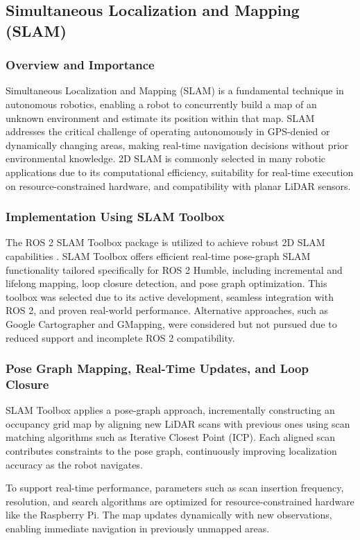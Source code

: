 \documentclass[english,project]{buwthesis}
\begin{document}
\subsection{Simultaneous Localization and Mapping (SLAM)}
\subsubsection{Overview and Importance}
Simultaneous Localization and Mapping (SLAM) is a fundamental technique in autonomous robotics, enabling a robot to concurrently build a map of an unknown environment and estimate its position within that map. SLAM addresses the critical challenge of operating autonomously in GPS-denied or dynamically changing areas, making real-time navigation decisions without prior environmental knowledge. 2D SLAM is commonly selected in many robotic applications due to its computational efficiency, suitability for real-time execution on resource-constrained hardware, and compatibility with planar LiDAR sensors.


\subsubsection{Implementation Using SLAM Toolbox}
The ROS 2 SLAM Toolbox package is utilized to achieve robust 2D SLAM capabilities \cite{Macenski2021}. SLAM Toolbox offers efficient real-time pose-graph SLAM functionality tailored specifically for ROS 2 Humble, including incremental and lifelong mapping, loop closure detection, and pose graph optimization. This toolbox was selected due to its active development, seamless integration with ROS 2, and proven real-world performance. Alternative approaches, such as Google Cartographer and GMapping, were considered but not pursued due to reduced support and incomplete ROS 2 compatibility.

\subsubsection{Pose Graph Mapping, Real-Time Updates, and Loop Closure}

SLAM Toolbox applies a pose-graph approach, incrementally constructing an occupancy grid map by aligning new LiDAR scans with previous ones using scan matching algorithms such as Iterative Closest Point (ICP). Each aligned scan contributes constraints to the pose graph, continuously improving localization accuracy as the robot navigates.

To support real-time performance, parameters such as scan insertion frequency, resolution, and search algorithms are optimized for resource-constrained hardware like the Raspberry Pi. The map updates dynamically with new observations, enabling immediate navigation in previously unmapped areas.
\end{document}
